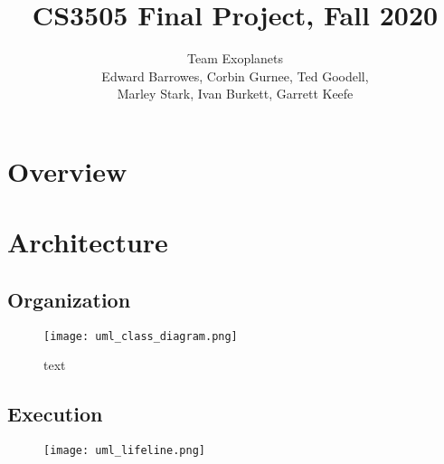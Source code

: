 \documentclass{article}
\begin{document}
\title{CS3505 Final Project, Fall 2020} %
\author{Team Exoplanets\\Edward Barrowes, Corbin Gurnee, Ted Goodell,\\Marley Stark, Ivan Burkett, Garrett Keefe}
\maketitle
\newpage

\section{Overview}
\section{Architecture}
  \subsection{Organization}


  \begin{figure}[h!]
    \texttt{[image: uml\_class\_diagram.png]}
    \caption{text}
    \label{}
  \end{figure}

  \subsection{Execution}
  \begin{figure}[h!]
    \texttt{[image: uml\_lifeline.png]}
    \caption{}
    \label{}
  \end{figure}
\end{document}
